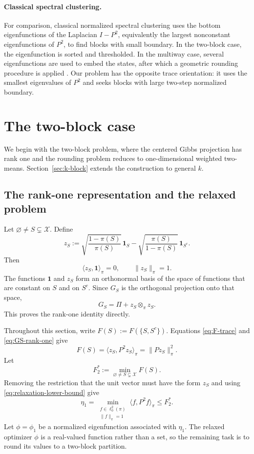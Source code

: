 \documentclass[11pt]{article}
\newcommand{\1}{\mathbf{1}}
\newcommand{\X}{\mathcal{X}}
\begin{document}
\paragraph{Classical spectral clustering.}
For comparison, classical normalized spectral clustering uses the
bottom eigenfunctions of the Laplacian $I-P^2$, equivalently the
largest nonconstant eigenfunctions of $P^2$, to find blocks with small boundary.
In the two-block case, the eigenfunction is sorted and thresholded.  In
the multiway case, several eigenfunctions are used to embed the states,
after which a geometric rounding procedure is applied
\citep{NgJordanWeiss2001}.  Our problem has the opposite trace
orientation: it uses the smallest eigenvalues of $P^2$ and seeks blocks
with large two-step normalized boundary.

\section{The two-block case}
\label{sec:two-block}

We begin with the two-block problem, where the centered Gibbs
projection has rank one and the rounding problem reduces to
one-dimensional weighted two-means.  Section~\ref{sec:k-block}
extends the construction to general $k$.

\subsection{The rank-one representation and the relaxed problem}

Let $\varnothing\neq S\subsetneq\X$.  Define
\begin{equation*}
	z_S
	:=\sqrt{\frac{1-\pi(S)}{\pi(S)}}\,\1_S
	-\sqrt{\frac{\pi(S)}{1-\pi(S)}}\,\1_{S^c}.
\end{equation*}
Then
\[
\langle z_S,\1\rangle_\pi=0,
\qquad
\|z_S\|_\pi=1.
\]
The functions $\1$ and $z_S$ form an orthonormal basis of the space of
functions that are constant on $S$ and on $S^c$.  Since $G_S$ is the
orthogonal projection onto that space,
\begin{equation}
    G_S=\Pi+z_S\otimes_\pi z_S.
    \label{eq:GS-rank-one}
\end{equation}
This proves the rank-one identity directly.

Throughout this section, write $F(S):=F(\{S,S^c\})$.  Equations
\eqref{eq:F-trace} and \eqref{eq:GS-rank-one} give
\begin{equation*}
    F(S)
    =\langle z_S,P^2z_S\rangle_\pi
    =\|Pz_S\|_\pi^2.
\end{equation*}
Let
\[
    F_2^*:=\min_{\varnothing\neq S\subsetneq\X}F(S).
\]
Removing the restriction that the unit vector must have the form
$z_S$ and using \eqref{eq:relaxation-lower-bound} give
\[
\eta_1
=
\min_{\substack{f\in\ell^2_0(\pi)\\ \|f\|_\pi=1}}
\langle f,P^2f\rangle_\pi
\leq F_2^*.
\]
Let $\phi=\phi_1$ be a normalized eigenfunction associated with
$\eta_1$. The relaxed optimizer $\phi$ is a real-valued function rather than a
set, so the remaining task is to round its values to a two-block
partition.
\end{document}
